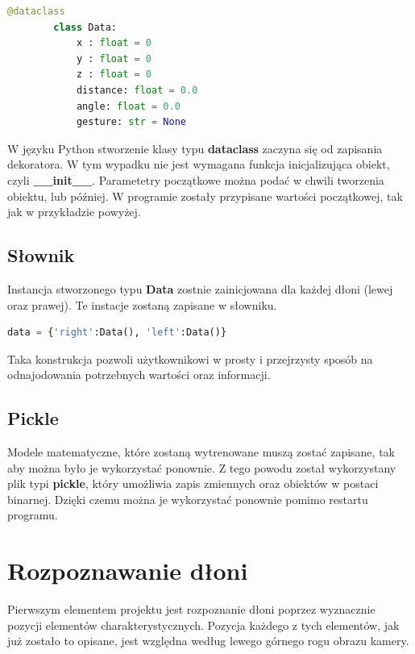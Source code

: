     \begin{lstlisting}[language=python]
        @dataclass
        class Data:
            x : float = 0
            y : float = 0
            z : float = 0
            distance: float = 0.0
            angle: float = 0.0
            gesture: str = None
    \end{lstlisting}

    \quad W języku Python stworzenie klasy typu \textbf{dataclass} zaczyna się od zapisania dekoratora. W tym wypadku nie jest wymagana funkcja inicjalizująca obiekt, czyli \textbf{\_\_init\_\_}. Parametetry początkowe można podać w chwili tworzenia obiektu, lub później. W programie zostały przypisane wartości początkowej, tak jak w przykładzie powyżej. 

    \subsection{Słownik}

    \quad Instancja stworzonego typu \textbf{Data} zostnie zainicjowana dla każdej dłoni (lewej oraz prawej). Te instacje zostaną zapisane w słowniku. 

    \begin{lstlisting}[language=python]
        data = {'right':Data(), 'left':Data()}
    \end{lstlisting}

    \quad Taka konstrukcja pozwoli użytkownikowi w prosty i przejrzysty sposób na odnajodowania potrzebnych wartości oraz informacji. 

    \subsection{Pickle}
    \quad Modele matematyczne, które zostaną wytrenowane muszą zostać zapisane, tak aby można było je wykorzystać ponownie. Z tego powodu został wykorzystany plik typi \textbf{pickle}, który umożliwia zapis zmiennych oraz obiektów w postaci binarnej. Dzięki czemu można je wykorzystać ponownie pomimo restartu programu. 

    \section{Rozpoznawanie dłoni}
    
    \quad Pierwszym elementem projektu jest rozpoznanie dłoni poprzez wyznacznie pozycji elementów charakterystycznych. Pozycja każdego z tych elementów, jak już zostało to opisane, jest względna według lewego górnego rogu obrazu kamery. 



